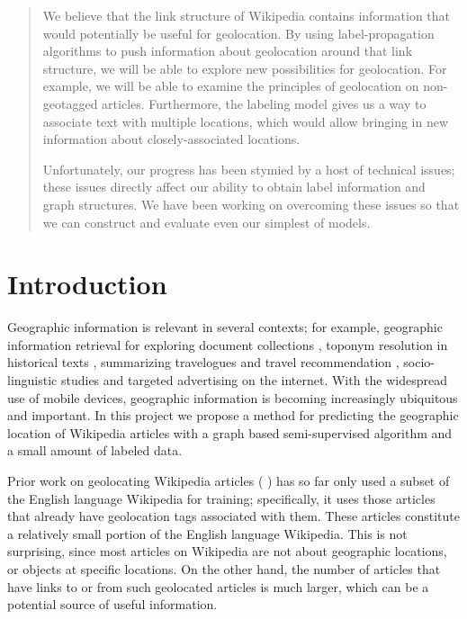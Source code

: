 \begin{abstract}
    We believe that the link structure of Wikipedia contains information that
    would potentially be useful for geolocation.
    By using label-propagation algorithms to push information about geolocation
    around that link structure, we will be able to explore new possibilities
    for geolocation. 
    For example, we will be able to examine the principles of geolocation on
    non-geotagged articles.
    Furthermore, the labeling model gives us a way to associate text with
    multiple locations, which would allow bringing in new information about
    closely-associated locations.
    \par
    Unfortunately, our progress has been stymied by a host of technical issues;
    these issues directly affect our ability to obtain label information and
    graph structures.
    We have been working on overcoming these issues so that we can construct
    and evaluate even our simplest of models.
\end{abstract}

\section{Introduction}
Geographic information is relevant in several contexts; for example, geographic
information retrieval for exploring document collections
\cite{ding2000computing}, toponym resolution in historical texts
\cite{smith2001disambiguating}, summarizing travelogues and travel
recommendation \cite{hao-et-al:10}, socio-linguistic studies
\cite{eisenstein-smith-xing:11} and targeted advertising on the internet. 
With the widespread use of mobile devices, geographic information is becoming
increasingly ubiquitous and important. 
In this project we propose a method for predicting the geographic location of
Wikipedia articles with a graph based semi-supervised algorithm and a small
amount of labeled data.

Prior work on geolocating Wikipedia articles (\cite{wing-baldridge:11}
\cite{rolleretal:12}) has so far only used a subset of the English language
Wikipedia for training; specifically, it uses those articles that already have
geolocation tags associated with them. 
These articles constitute a relatively small portion of the English language
Wikipedia.  
This is not surprising, since most articles on Wikipedia are not about
geographic locations, or objects at specific locations.
On the other hand, the number of articles that have links to or from such
geolocated articles is much larger, which can be a potential source of useful
information. 

